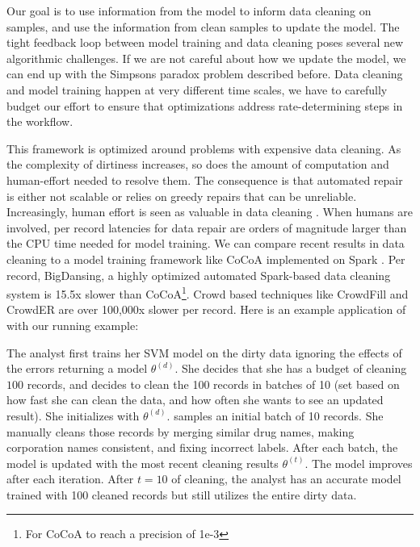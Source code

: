 Our goal is to use information from the model to inform data cleaning on samples, and use the information from clean samples to update the model.
The tight feedback loop between model training and data cleaning poses several new algorithmic challenges. 
If we are not careful about how we update the model, we can end up with the Simpsons paradox problem described before.
Data cleaning and model training happen at very different time scales, we have to carefully budget our effort to ensure that optimizations address rate-determining steps in the workflow.

This framework is optimized around problems with expensive data cleaning.
As the complexity of dirtiness increases, so does the amount of computation and human-effort needed to resolve them.
The consequence is that automated repair is either not scalable or relies on greedy repairs that can be unreliable.
Increasingly, human effort is seen as valuable in data cleaning \cite{park2014crowdfill, wang2012crowder, gokhale2014corleone, wang1999sample}.
When humans are involved, per record latencies for data repair are orders of magnitude larger than the CPU time needed for model training.
We can compare recent results in data cleaning to a model training framework like CoCoA implemented on Spark \cite{jaggi2014communication}.
Per record, BigDansing, a highly optimized automated Spark-based data cleaning system is 15.5x slower than CoCoA\footnote{For CoCoA to reach a precision of 1e-3}.
Crowd based techniques like CrowdFill \cite{park2014crowdfill} and CrowdER \cite{wang2012crowder} are over 100,000x slower per record. Here is an example application of \sys with our running example:
\begin{example}
The analyst first trains her SVM model on the dirty data ignoring the effects of the errors returning a model $\theta^{(d)}$.
She decides that she has a budget of cleaning $100$ records, and decides to clean the 100 records in batches of 10 (set based on how fast she can clean the data, and how often she wants to see an updated result).
She initializes \sys with $\theta^{(d)}$.
\sys samples an initial batch of 10 records.
She manually cleans those records by merging similar drug names, making corporation names consistent, and fixing incorrect labels.
After each batch, the model is updated with the most recent cleaning results $\theta^{(t)}$.
The model improves after each iteration.
After $t=10$ of cleaning, the analyst has an accurate model trained with 100 cleaned records but still utilizes the entire dirty data.
\end{example}

